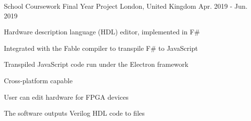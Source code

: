 \begin{cventries}
    \cventry
    {School Coursework} %
    {Final Year Project} %
    {London, United Kingdom} %
    {Apr. 2019 - Jun. 2019} %
    {
      \begin{cvitems} %
        \item {Hardware description language (HDL) editor, implemented in F\#}
        \item {Integrated with the Fable compiler to transpile F\# to JavaScript}
        \item {Transpiled JavaScript code run under the Electron framework}
        \item {Cross-platform capable}
        \item {User can edit hardware for FPGA devices}
        \item {The software outputs Verilog HDL code to files}
      \end{cvitems}
    }

\end{cventries}